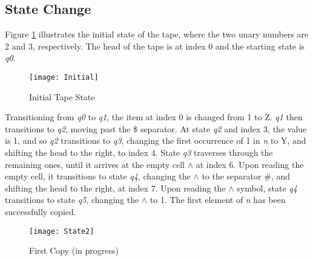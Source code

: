 \documentclass[a4paper,12pt]{article}
\begin{document}
\subsection{State Change}
\label{analysis}
Figure \ref{fig:initial} illustrates the initial state of the tape, where the two unary numbers are 2 and 3, respectively. The head of the tape is at index 0 and the starting state is \textit{q0}.
\begin{figure}[H]
	\centering
	\texttt{[image: Initial]}
	\caption{Initial Tape State}
	\label{fig:initial}
\end{figure}

Transitioning from \textit{q0} to \textit{q1}, the item at index 0 is changed from 1 to Z. \textit{q1} then transitions to \textit{q2}, moving past the \$ separator. At state \textit{q2} and index 3, the value is 1, and so \textit{q2} transitions to \textit{q3}, changing the first occurrence of 1 in \textit{n} to Y, and shifting the head to the right, to index 4. State \textit{q3} traverses through the remaining ones, until it arrives at the empty cell $\land$ at index 6. Upon reading the empty cell, it transitions to state \textit{q4}, changing the $\land$ to the separator \#, and shifting the head to the right, at index 7. Upon reading the $\land$ symbol, state \textit{q4} transitions to state \textit{q5}, changing the $\land$ to 1. The first element of \textit{n} has been successfully copied.
\begin{figure}[H]
	\centering
	\texttt{[image: State2]}
	\caption{First Copy (in progress)}
	\label{fig:state2}
\end{figure}
\end{document}
